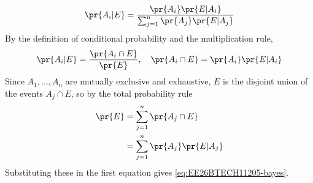 \begin{enumerate}[label=\thesubsection.\arabic*, ref=\thesubsection.\theenumi]
\begin{align}
	\pr{A_i|E} = \frac{\pr{A_i}\pr{E|A_i}}{\sum_{j=1}^{n}\pr{A_j}\pr{E|A_j}} \label{eq:EE26BTECH11205-bayes}
\end{align}
\solution By the definition of conditional probability and the multiplication rule,
\begin{align}
	\pr{A_i|E} = \frac{\pr{A_i \cap E}}{\pr{E}}, \quad \pr{A_i \cap E} = \pr{A_i}\pr{E|A_i}
\end{align}
Since $A_1,\dots,A_n$ are mutually exclusive and exhaustive, $E$ is the disjoint union of the events $A_j \cap E$, so by the total probability rule
\begin{align}
	\pr{E} &= \sum_{j=1}^{n}\pr{A_j \cap E} \notag
	\\
	&= \sum_{j=1}^{n}\pr{A_j}\pr{E|A_j}
\end{align}
Substituting these in the first equation gives \eqref{eq:EE26BTECH11205-bayes}.
\end{enumerate}
